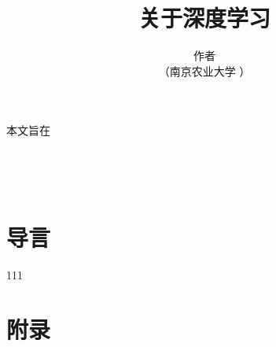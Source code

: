 \documentclass[10.5pt,a4paper]{article}%
\title{\fontsize{22pt}{20pt}\selectfont%
	{\heiti%
		关于深度学习}}%
\author{\fontsize{12pt}{12pt}\selectfont%
	{\fangsong%
		作者}\\%
	\fontsize{10.5pt}{15.75pt}\selectfont%
	{\fangsong%
		（南京农业大学 ）}}%
\date{}%
\begin{document}
	\maketitle%
	\lhead{}%
	\chead{}%
	\rhead{}%
	\lfoot{}%
	\cfoot{\thepage}%
	\rfoot{}%
	\begin{adjustwidth}{1.06cm}{1.06cm}
            \fontsize{9pt}{13.5pt}\songti 本文旨在
	\end{adjustwidth}
	\begin{adjustwidth}{1.06cm}{1.06cm}
		\fontsize{9pt}{10pt}\\
	\end{adjustwidth}

	\begin{adjustwidth}{1.06cm}{1.06cm}%
		\fontsize{9pt}{10pt}
	\end{adjustwidth}
         \begin{adjustwidth}{1.06cm}{1.06cm}
		\fontsize{9pt}{10pt}\\
	\end{adjustwidth}
	\newpage%
        \section{导言}
     		    111\cite{d2l}\par
\newpage


\newpage
\section{附录}
                  
\end{document}
